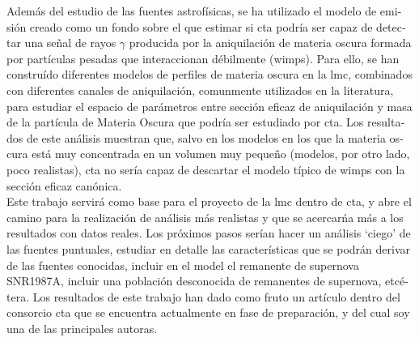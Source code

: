 \documentclass[main.tex]{subfiles}
\begin{document}
\begin{otherlanguage}{spanish}
Además del estudio de las fuentes astrofísicas, se ha utilizado el modelo de emisión creado como un fondo sobre el que estimar si \gls{cta} podría ser capaz de detectar una señal de rayos $\gamma$ producida por la aniquilación de materia oscura formada por partículas pesadas que interaccionan débilmente (\glspl{wimp}). Para ello, se han construído diferentes modelos de perfiles de materia oscura en la \gls{lmc}, combinados con diferentes canales de aniquilación, comunmente utilizados en la literatura, para estudiar el espacio de parámetros entre sección eficaz de aniquilación y masa de la partícula de Materia Oscura que podría ser estudiado por \gls{cta}. Los resultados de este análisis muestran que, salvo en los modelos en los que la materia oscura está muy concentrada en un volumen muy pequeño (modelos, por otro lado, poco realistas), \gls{cta} no sería capaz de descartar el modelo típico de \glspl{wimp} con la sección eficaz canónica. \\
Este trabajo servirá como base para el proyecto de la \gls{lmc} dentro de \gls{cta}, y abre el camino para la realización de análisis más realistas y que se acercarńa más a los resultados con datos reales. Los próximos pasos serían hacer un análisis `ciego' de las fuentes puntuales, estudiar en detalle las características que se podrán derivar de las fuentes conocidas, incluir en el model el remanente de supernova SNR1987A, incluir una población desconocida de remanentes de supernova, etcétera.
Los resultados de este trabajo han dado como fruto un artículo dentro del consorcio \gls{cta} que se encuentra actualmente en fase de preparación, y del cual soy una de las principales autoras.
\end{otherlanguage}
\end{document}
